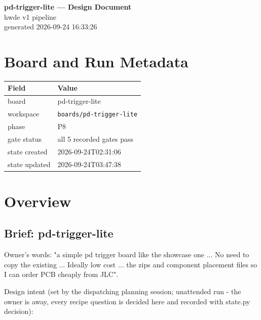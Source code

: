 \documentclass[11pt,a4paper]{article}
\begin{document}
\sloppy
\begin{center}
{\LARGE\bfseries pd-trigger-lite --- Design Document}\\[6pt]
{\large hwde v1 pipeline}\\[2pt]
generated 2026-09-24 16:33:26
\end{center}
\tableofcontents

\section{Board and Run Metadata}
{\small
\begin{longtable}{lp{11cm}}
\toprule
\textbf{Field} & \textbf{Value} \\
\midrule
\endhead
board & pd-trigger-lite \\
workspace & \texttt{boards/pd-trigger-lite} \\
phase & P8 \\
gate status & all 5 recorded gates pass \\
state created & 2026-09-24T02:31:06 \\
state updated & 2026-09-24T03:47:38 \\
\bottomrule
\end{longtable}
}
\section{Overview}
\subsection*{Brief: pd-trigger-lite}
Owner's words: "a simple pd trigger board like the showcase one ... No need to copy the existing ... Ideally low cost ... the zips and component placement files so I can order PCB cheaply from JLC".

Design intent (set by the dispatching planning session; unattended run - the owner is away, every recipe question is decided here and recorded with state.py decision):
\end{document}
